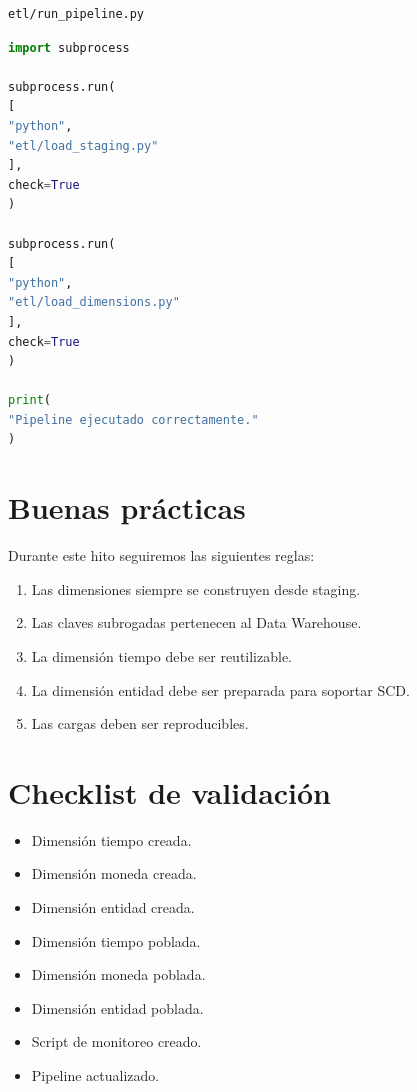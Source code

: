 \begin{verbatim}
etl/run_pipeline.py
\end{verbatim}

\begin{lstlisting}[language=Python]
import subprocess

subprocess.run(
[
"python",
"etl/load_staging.py"
],
check=True
)

subprocess.run(
[
"python",
"etl/load_dimensions.py"
],
check=True
)

print(
"Pipeline ejecutado correctamente."
)
\end{lstlisting}

\section{Buenas prácticas}

Durante este hito seguiremos las siguientes reglas:

\begin{enumerate}
\item Las dimensiones siempre se construyen desde staging.
\item Las claves subrogadas pertenecen al Data Warehouse.
\item La dimensión tiempo debe ser reutilizable.
\item La dimensión entidad debe ser preparada para soportar SCD.
\item Las cargas deben ser reproducibles.
\end{enumerate}

\section{Checklist de validación}

\begin{itemize}
\item[$\Box$] Dimensión tiempo creada.
\item[$\Box$] Dimensión moneda creada.
\item[$\Box$] Dimensión entidad creada.
\item[$\Box$] Dimensión tiempo poblada.
\item[$\Box$] Dimensión moneda poblada.
\item[$\Box$] Dimensión entidad poblada.
\item[$\Box$] Script de monitoreo creado.
\item[$\Box$] Pipeline actualizado.
\end{itemize}

